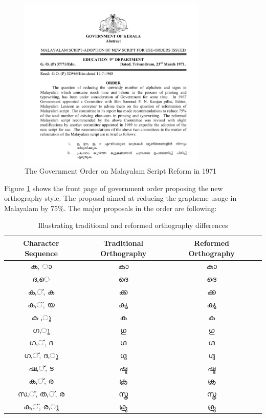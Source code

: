 \documentclass[10pt]{article}
\begin{document}
\begin{figure}[h!]
	\centering
	\includegraphics[width=0.8\textwidth]{images/1971-gov-script-reformation-order.png}
	\caption{The Government Order on Malayalam Script Reform in 1971}
	\label{go1971}
\end{figure}

Figure \ref{go1971} shows the front page of government order proposing the new orthography style. The proposal aimed at reducing the grapheme usage in Malayalam by 75\%. The major proposals in the order are following: \cite{1971go}


\begin{table}
	\centering
	
	\begin{tabular}{|c|c|c|c}
		\hline
		Character Sequence & Traditional Orthography & Reformed Orthography \\ \hline
		{\manjari ക, ാ} & {\manjari കാ} & {\raghu കാ} \\
		\hline
		{\manjari ദ,െ} & {\manjari ദെ} & {\raghu ദെ}  \\
		\hline
		{\manjari ക,്, ക} & {\manjari ക്ക} & {\raghu ക്ക} \\
		\hline
		{\manjari ക,്, യ} & {\manjari ക്യ} & {\raghu ക്യ} \\
		\hline
		{\manjari ക ,ു} & {\manjari കു} & {\raghu കു} \\
		\hline
		{\manjari ഗ,ു} & {\manjari ഗു} & {\raghu ഗു} \\
		\hline
		{\manjari ഗ,്, ദ} & {\manjari ഗ്ദ} & {\raghu ഗ്ദ} \\
		\hline
		{\manjari ഗ,്, ദ,ു} & {\manjari ഗ്ദു} & {\raghu ഗ്ദു} \\
		\hline
		{\manjari ഷ,്, ട} & {\manjari ഷ്ട} & {\raghu ഷ്ട} \\	
		\hline
		{\manjari ക,്, ര} & {\manjari ക്ര} & {\raghu ക്ര} \\
		\hline
		{\manjari സ,്, ത,്, ര} & {\manjari സ്ത്ര} & {\raghu സ്ത്ര} \\
		\hline
		{\manjari ക,്, ര,ു} & {\manjari ക്രു} & {\raghu ക്രു} \\
		\hline
		
	\end{tabular}
	\caption{Illustrating traditional and reformed orthography differences}
	\label{orthographycomparison}
\end{table}
\end{document}
